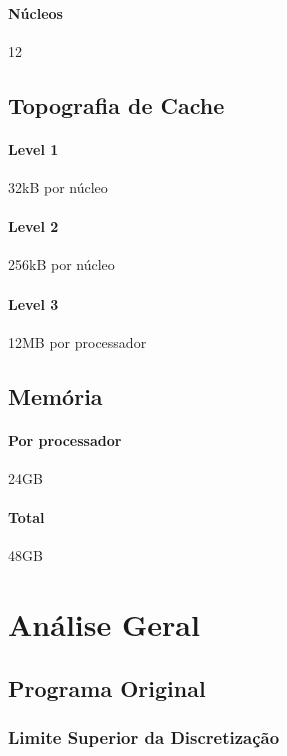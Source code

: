 \documentclass[12pt]{article}
\begin{document}
\paragraph{Núcleos} 12

\subsection{Topografia de Cache}
\paragraph{Level 1} 32kB por núcleo
\paragraph{Level 2} 256kB por núcleo
\paragraph{Level 3} 12MB por processador

\subsection{Memória}
\paragraph{Por processador} 24GB
\paragraph{Total} 48GB

\newpage


\newpage

\section{Análise Geral}

	\subsection{Programa Original}
	\subsubsection{Limite Superior da Discretização}
\end{document}
